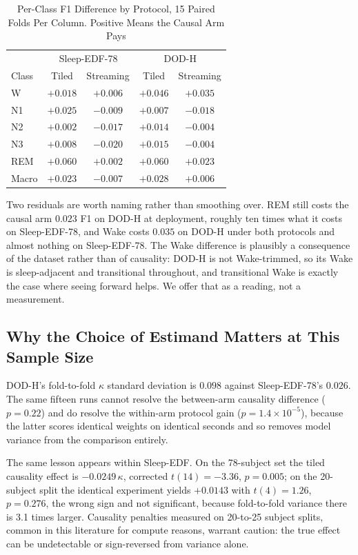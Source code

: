 \documentclass[conference]{IEEEtran}
\begin{document}
\begin{table}[t]
\caption{Per-Class F1 Difference by Protocol, 15 Paired Folds Per Column. Positive Means the Causal
Arm Pays}
\label{tab:perclass}
\centering
\footnotesize
\setlength{\tabcolsep}{3.2pt}
\begin{tabular}{lcc|cc}
\toprule
 & \multicolumn{2}{c|}{Sleep-EDF-78} & \multicolumn{2}{c}{DOD-H} \\
Class & Tiled & Streaming & Tiled & Streaming \\
\midrule
W   & $+0.018$ & $+0.006$ & $+0.046$ & $+0.035$ \\
N1  & $+0.025$ & $-0.009$ & $+0.007$ & $-0.018$ \\
N2  & $+0.002$ & $-0.017$ & $+0.014$ & $-0.004$ \\
N3  & $+0.008$ & $-0.020$ & $+0.015$ & $-0.004$ \\
REM & $\mathbf{+0.060}$ & $\mathbf{+0.002}$ & $\mathbf{+0.060}$ & $\mathbf{+0.023}$ \\
\midrule
Macro & $+0.023$ & $-0.007$ & $+0.028$ & $+0.006$ \\
\bottomrule
\end{tabular}
\end{table}

Two residuals are worth naming rather than smoothing over. REM still costs the causal arm $0.023$
F1 on DOD-H at deployment, roughly ten times what it costs on Sleep-EDF-78, and Wake costs $0.035$
on DOD-H under both protocols and almost nothing on Sleep-EDF-78. The Wake difference is plausibly
a consequence of the dataset rather than of causality: DOD-H is not Wake-trimmed, so its Wake is
sleep-adjacent and transitional throughout, and transitional Wake is exactly the case where seeing
forward helps. We offer that as a reading, not a measurement.

\subsection{Why the Choice of Estimand Matters at This Sample Size}
\label{sec:estimand}

DOD-H's fold-to-fold $\kappa$ standard deviation is $0.098$ against Sleep-EDF-78's $0.026$. The
same fifteen runs cannot resolve the between-arm causality difference ($p = 0.22$) and do resolve
the within-arm protocol gain ($p = 1.4\times10^{-5}$), because the latter scores identical weights
on identical seconds and so removes model variance from the comparison entirely.

The same lesson appears within Sleep-EDF. On the 78-subject set the tiled causality effect is
$-0.0249\,\kappa$, corrected $t(14) = -3.36$, $p = 0.005$; on the 20-subject split the identical
experiment yields $+0.0143$ with $t(4) = 1.26$, $p = 0.276$, the wrong sign and not significant,
because fold-to-fold variance there is 3.1 times larger. Causality penalties measured on 20-to-25
subject splits, common in this literature for compute reasons, warrant caution: the true effect can
be undetectable or sign-reversed from variance alone.
\end{document}
